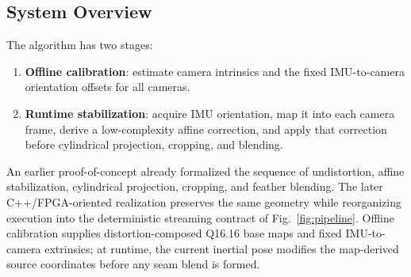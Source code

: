 \documentclass[journal]{IEEEtran}
\begin{document}
\subsection{System Overview}
The algorithm has two stages:
\begin{enumerate}[leftmargin=*,itemsep=0pt,topsep=2pt]
  \item \textbf{Offline calibration}: estimate camera intrinsics and the fixed IMU-to-camera orientation offsets for all cameras.
  \item \textbf{Runtime stabilization}: acquire IMU orientation, map it into each camera frame, derive a low-complexity affine correction, and apply that correction before cylindrical projection, cropping, and blending.
\end{enumerate}

An earlier proof-of-concept already formalized the sequence of undistortion, affine stabilization, cylindrical projection, cropping, and feather blending. The later C++/FPGA-oriented realization preserves the same geometry while reorganizing execution into the deterministic streaming contract of Fig.~\ref{fig:pipeline}. Offline calibration supplies distortion-composed Q16.16 base maps and fixed IMU-to-camera extrinsics; at runtime, the current inertial pose modifies the map-derived source coordinates before any seam blend is formed.
\end{document}
